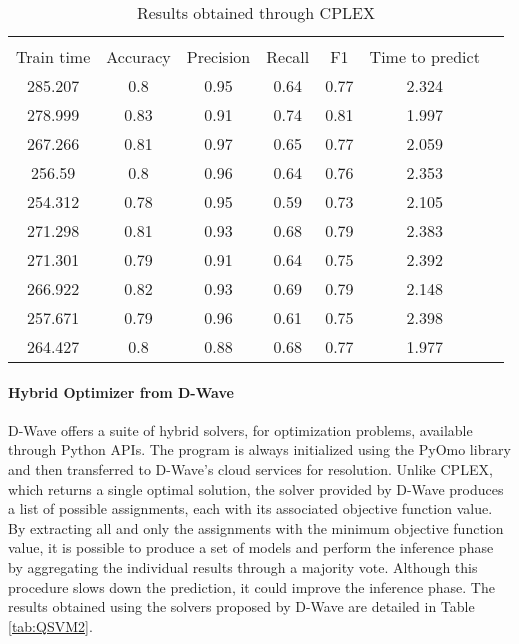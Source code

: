 \begin{table}[h]
    \centering
    \begin{tabular}{ccccccc}
    \toprule                                                             \\                    
    Train time & Accuracy & Precision & Recall & F1    & Time to predict \\
    \midrule
    285.207    & 0.8      & 0.95      & 0.64   & 0.77  & 2.324           \\
    278.999    & 0.83     & 0.91      & 0.74   & 0.81  & 1.997           \\
    267.266    & 0.81     & 0.97      & 0.65   & 0.77  & 2.059           \\
    256.59     & 0.8      & 0.96      & 0.64   & 0.76  & 2.353           \\
    254.312    & 0.78     & 0.95      & 0.59   & 0.73  & 2.105           \\
    271.298    & 0.81     & 0.93      & 0.68   & 0.79  & 2.383           \\
    271.301    & 0.79     & 0.91      & 0.64   & 0.75  & 2.392           \\
    266.922    & 0.82     & 0.93      & 0.69   & 0.79  & 2.148           \\
    257.671    & 0.79     & 0.96      & 0.61   & 0.75  & 2.398           \\
    264.427    & 0.8      & 0.88      & 0.68   & 0.77  & 1.977           \\
    \bottomrule
    \end{tabular}
    \caption{Results obtained through CPLEX}
    \label{tab:QSVM1}
\end{table}

\paragraph{Hybrid Optimizer from D-Wave} D-Wave offers a suite of hybrid solvers, for optimization problems, available through Python APIs\cite{hss}. The program is always initialized using the PyOmo library and then transferred to D-Wave's cloud services for resolution. Unlike CPLEX, which returns a single optimal solution, the solver provided by D-Wave produces a list of possible assignments, each with its associated objective function value. By extracting all and only the assignments with the minimum objective function value, it is possible to produce a set of models and perform the inference phase by aggregating the individual results through a majority vote. Although this procedure slows down the prediction, it could improve the inference phase. The results obtained using the solvers proposed by D-Wave are detailed in Table \ref{tab:QSVM2}.

